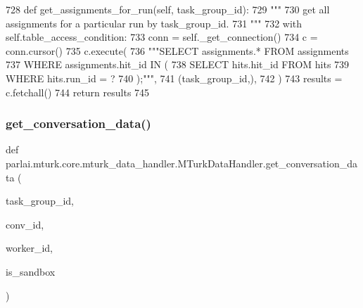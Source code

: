 \begin{DoxyCode}
728     \textcolor{keyword}{def }get\_assignments\_for\_run(self, task\_group\_id):
729         \textcolor{stringliteral}{"""}
730 \textcolor{stringliteral}{        get all assignments for a particular run by task\_group\_id.}
731 \textcolor{stringliteral}{        """}
732         with self.table\_access\_condition:
733             conn = self.\_get\_connection()
734             c = conn.cursor()
735             c.execute(
736                 \textcolor{stringliteral}{"""SELECT assignments.* FROM assignments}
737 \textcolor{stringliteral}{                         WHERE assignments.hit\_id IN (}
738 \textcolor{stringliteral}{                           SELECT hits.hit\_id FROM hits}
739 \textcolor{stringliteral}{                           WHERE hits.run\_id = ?}
740 \textcolor{stringliteral}{                         );"""},
741                 (task\_group\_id,),
742             )
743             results = c.fetchall()
744             \textcolor{keywordflow}{return} results
745 
\end{DoxyCode}
\mbox{\label{classparlai_1_1mturk_1_1core_1_1mturk__data__handler_1_1MTurkDataHandler_a0a245b58629056030d5eedfce5c5a985}} 
\subsubsection{\texorpdfstring{get\+\_\+conversation\+\_\+data()}{get\_conversation\_data()}}
{\footnotesize\ttfamily def parlai.\+mturk.\+core.\+mturk\+\_\+data\+\_\+handler.\+M\+Turk\+Data\+Handler.\+get\+\_\+conversation\+\_\+data (\begin{DoxyParamCaption}\item[{}]{task\+\_\+group\+\_\+id,  }\item[{}]{conv\+\_\+id,  }\item[{}]{worker\+\_\+id,  }\item[{}]{is\+\_\+sandbox }\end{DoxyParamCaption})\hspace{0.3cm}{\ttfamily [static]}}

